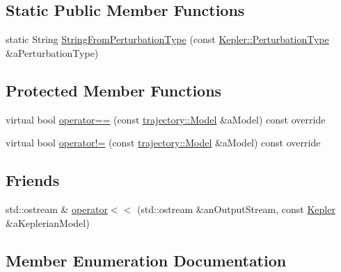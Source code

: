 \subsection*{Static Public Member Functions}
\begin{DoxyCompactItemize}
\item 
static String \hyperlink{classostk_1_1astro_1_1trajectory_1_1orbit_1_1models_1_1_kepler_ad780ed9b53e355ebef1597f86d30cf84}{String\+From\+Perturbation\+Type} (const \hyperlink{classostk_1_1astro_1_1trajectory_1_1orbit_1_1models_1_1_kepler_a3750f9177ff06a1938826e2c2881d5a9}{Kepler\+::\+Perturbation\+Type} \&a\+Perturbation\+Type)
\end{DoxyCompactItemize}
\subsection*{Protected Member Functions}
\begin{DoxyCompactItemize}
\item 
virtual bool \hyperlink{classostk_1_1astro_1_1trajectory_1_1orbit_1_1models_1_1_kepler_ad2a61eb0cbd9887fc2180dc0818c209e}{operator==} (const \hyperlink{classostk_1_1astro_1_1trajectory_1_1_model}{trajectory\+::\+Model} \&a\+Model) const override
\item 
virtual bool \hyperlink{classostk_1_1astro_1_1trajectory_1_1orbit_1_1models_1_1_kepler_ab343575a423c5cecea4b21fa79c80726}{operator!=} (const \hyperlink{classostk_1_1astro_1_1trajectory_1_1_model}{trajectory\+::\+Model} \&a\+Model) const override
\end{DoxyCompactItemize}
\subsection*{Friends}
\begin{DoxyCompactItemize}
\item 
std\+::ostream \& \hyperlink{classostk_1_1astro_1_1trajectory_1_1orbit_1_1models_1_1_kepler_aedb386ce32716dfb187f89b52b023f2b}{operator$<$$<$} (std\+::ostream \&an\+Output\+Stream, const \hyperlink{classostk_1_1astro_1_1trajectory_1_1orbit_1_1models_1_1_kepler}{Kepler} \&a\+Keplerian\+Model)
\end{DoxyCompactItemize}


\subsection{Member Enumeration Documentation}
\mbox{\label{classostk_1_1astro_1_1trajectory_1_1orbit_1_1models_1_1_kepler_a3750f9177ff06a1938826e2c2881d5a9}} 
